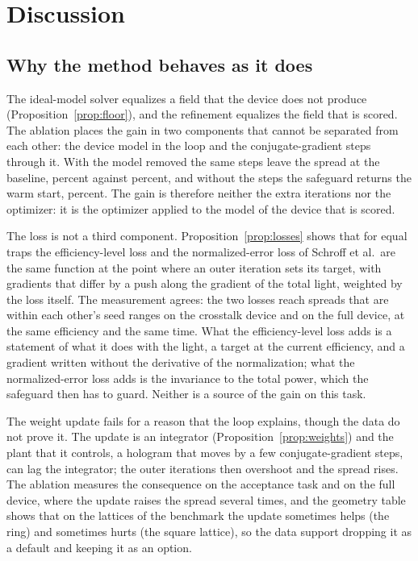 \section{Discussion}\label{sec:discussion}

\subsection{Why the method behaves as it does}

The ideal-model solver equalizes a field that the device does not produce (Proposition~\ref{prop:floor}), and the refinement equalizes the field that is scored. The ablation places the gain in two components that cannot be separated from each other: the device model in the loop and the conjugate-gradient steps through it. With the model removed the same steps leave the spread at the baseline, \ablBNoModelSig{} percent against \sigmaMsevenThirty{} percent, and without the steps the safeguard returns the warm start, \ablBNoStepSig{} percent. The gain is therefore neither the extra iterations nor the optimizer: it is the optimizer applied to the model of the device that is scored.

The loss is not a third component. Proposition~\ref{prop:losses} shows that for equal traps the efficiency-level loss and the normalized-error loss of Schroff et al.\ are the same function at the point where an outer iteration sets its target, with gradients that differ by a push along the gradient of the total light, weighted by the loss itself. The measurement agrees: the two losses reach spreads that are within each other's seed ranges on the crosstalk device and on the full device, at the same efficiency and the same time. What the efficiency-level loss adds is a statement of what it does with the light, a target at the current efficiency, and a gradient written without the derivative of the normalization; what the normalized-error loss adds is the invariance to the total power, which the safeguard then has to guard. Neither is a source of the gain on this task.

The weight update fails for a reason that the loop explains, though the data do not prove it. The update is an integrator (Proposition~\ref{prop:weights}) and the plant that it controls, a hologram that moves by a few conjugate-gradient steps, can lag the integrator; the outer iterations then overshoot and the spread rises. The ablation measures the consequence on the acceptance task and on the full device, where the update raises the spread several times, and the geometry table shows that on the lattices of the benchmark the update sometimes helps (the ring) and sometimes hurts (the square lattice), so the data support dropping it as a default and keeping it as an option.

